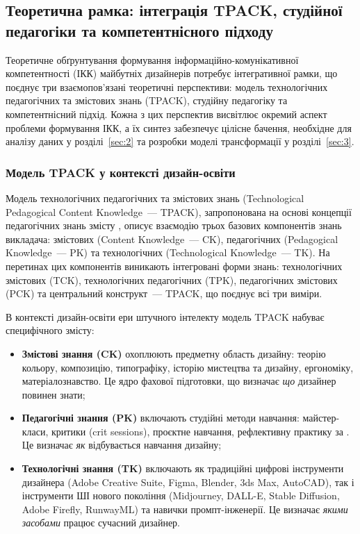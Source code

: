 \subsection{Теоретична рамка: інтеграція TPACK, студійної педагогіки та компетентнісного підходу}\label{subsec:1.4}

Теоретичне обґрунтування формування інформаційно-комунікативної компетентності (ІКК) майбутніх дизайнерів потребує інтегративної рамки, що поєднує три взаємопов'язані теоретичні перспективи: модель технологічних педагогічних та змістових знань (TPACK), студійну педагогіку та компетентнісний підхід. Кожна з цих перспектив висвітлює окремий аспект проблеми формування ІКК, а їх синтез забезпечує цілісне бачення, необхідне для аналізу даних у розділі~\ref{sec:2} та розробки моделі трансформації у розділі~\ref{sec:3}.

\subsubsection{Модель TPACK у контексті дизайн-освіти}\label{sssec:1.4.1}

Модель технологічних педагогічних та змістових знань (Technological Pedagogical Content Knowledge~--- TPACK), запропонована \citet{Mishra2006} на основі концепції педагогічних знань змісту \citet{Shulman1986}, описує взаємодію трьох базових компонентів знань викладача: змістових (Content Knowledge~--- CK), педагогічних (Pedagogical Knowledge~--- PK) та технологічних (Technological Knowledge~--- TK). На перетинах цих компонентів виникають інтегровані форми знань: технологічних змістових (TCK), технологічних педагогічних (TPK), педагогічних змістових (PCK) та центральний конструкт~--- TPACK, що поєднує всі три виміри.

В контексті дизайн-освіти ери штучного інтелекту модель TPACK набуває специфічного змісту:

\begin{itemize}
    \item \textbf{Змістові знання (CK)} охоплюють предметну область дизайну: теорію кольору, композицію, типографіку, історію мистецтва та дизайну, ергономіку, матеріалознавство. Це ядро фахової підготовки, що визначає \textit{що} дизайнер повинен знати;
    \item \textbf{Педагогічні знання (PK)} включають студійні методи навчання: майстер-класи, критики (crit sessions), проєктне навчання, рефлективну практику за \citet{Schon1983}. Це визначає \textit{як} відбувається навчання дизайну;
    \item \textbf{Технологічні знання (TK)} включають як традиційні цифрові інструменти дизайнера (Adobe Creative Suite, Figma, Blender, 3ds Max, AutoCAD), так і інструменти ШІ нового покоління (Midjourney, DALL-E, Stable Diffusion, Adobe Firefly, RunwayML) та навички промпт-інженерії. Це визначає \textit{якими засобами} працює сучасний дизайнер.
\end{itemize}

